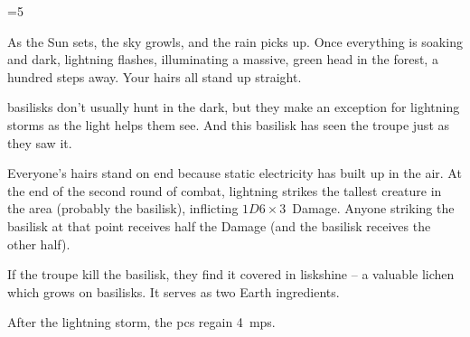 \ifnum\value{cycle}=5

\begin{boxtext}
  As the Sun sets, the sky growls, and the rain picks up.
  Once everything is soaking and dark, lightning flashes, illuminating a massive, green head in the forest, a hundred \glspl{step} away.
  Your hairs all stand up straight.
\end{boxtext}

\Glspl{basilisk} don't usually hunt in the dark, but they make an exception for lightning storms as the light helps them see.
And this \gls{basilisk} has seen the troupe just as they saw it.

Everyone's hairs stand on end because static electricity has built up in the air.
At the end of the second \gls{round} of combat, lightning strikes the tallest creature in the area (probably the \gls{basilisk}), inflicting $1D6\times 3$~Damage.
Anyone striking the \gls{basilisk} at that point receives half the Damage (and the \gls{basilisk} receives the other half).

\basilisk

If the troupe kill the \gls{basilisk}, they find it covered in liskshine -- a valuable lichen which grows on \glspl{basilisk}.%
It serves as two Earth \glspl{ingredient}.

After the lightning storm, the \glspl{pc} regain 4~\glspl{mp}.

\fi
